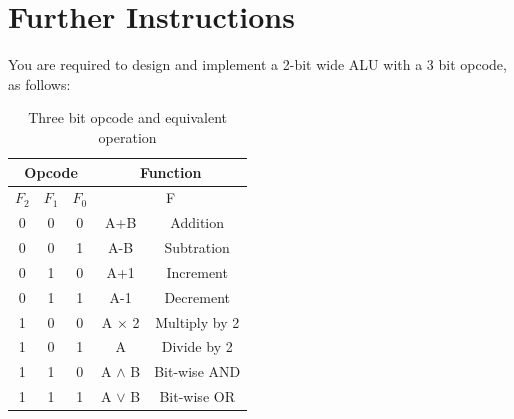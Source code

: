 \section{Further Instructions}
You are required to design and implement a 2-bit wide ALU with a 3 bit opcode, as follows:
\begin{table}[H]
\centering
\caption{Three bit opcode and equivalent operation}
\label{tbl:Opcodes}
\begin{tabular}{|c|c|c|c|c|}
\hline
\multicolumn{3}{|c|}{\textbf{Opcode}} & \multicolumn{2}{c|}{\textbf{Function}} \\ \hline
$F_2$ & $F_1$ & $F_0$ & \multicolumn{2}{c|}{F} \\ \hline
0 & 0 & 0 & A+B & Addition \\ \hline
0 & 0 & 1 & A-B & Subtration \\ \hline
0 & 1 & 0 & A+1 & Increment \\ \hline
0 & 1 & 1 & A-1 & Decrement \\ \hline
1 & 0 & 0 & A $\times$ 2 & Multiply by 2 \\ \hline
1 & 0 & 1 & A \textdiv 2 & Divide by 2 \\ \hline
1 & 1 & 0 & A $\wedge$ B & Bit-wise AND \\ \hline
1 & 1 & 1 & A $\vee$ B & Bit-wise OR \\ \hline
\end{tabular}%
\end{table}